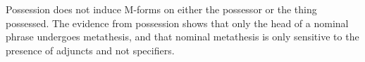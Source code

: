 Possession does not induce M-forms on either the possessor or the thing possessed.
The evidence from possession shows that only the head of a nominal phrase
undergoes metathesis, and that nominal metathesis is only sensitive to the presence
of adjuncts and not specifiers.

